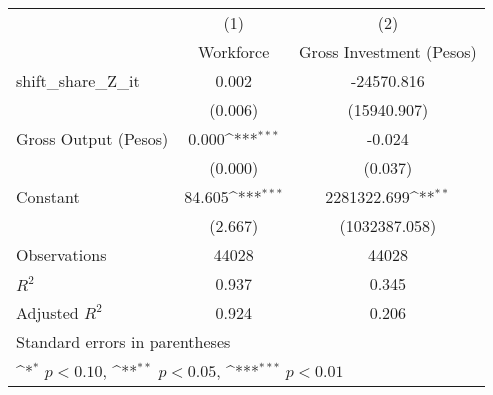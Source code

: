 {
\def\sym#1{\ifmmode^{#1}\else\(^{#1}\)\fi}
\begin{tabular}{l*{2}{c}}
\hline\hline
                &\multicolumn{1}{c}{(1)}&\multicolumn{1}{c}{(2)}\\
                &\multicolumn{1}{c}{Workforce}&\multicolumn{1}{c}{Gross Investment (Pesos)}\\
\hline
shift\_share\_Z\_it&    0.002         &-24570.816         \\
                &  (0.006)         &(15940.907)         \\
[1em]
Gross Output (Pesos)&    0.000\sym{***}&   -0.024         \\
                &  (0.000)         &  (0.037)         \\
[1em]
Constant        &   84.605\sym{***}&2281322.699\sym{**} \\
                &  (2.667)         &(1032387.058)         \\
\hline
Observations    &    44028         &    44028         \\
\(R^{2}\)       &    0.937         &    0.345         \\
Adjusted \(R^{2}\)&    0.924         &    0.206         \\
\hline\hline
\multicolumn{3}{l}{\footnotesize Standard errors in parentheses}\\
\multicolumn{3}{l}{\footnotesize \sym{*} \(p<0.10\), \sym{**} \(p<0.05\), \sym{***} \(p<0.01\)}\\
\end{tabular}
}
